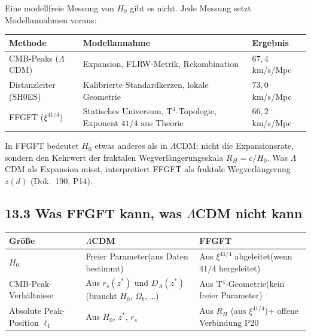 Eine modellfreie Messung von $H_0$ gibt es nicht.
Jede Messung setzt Modellannahmen voraus:

\begin{center}
\begin{tabular}{p{3.5cm}p{5.5cm}p{3cm}}
\toprule
\textbf{Methode} & \textbf{Modellannahme} & \textbf{Ergebnis} \\
\midrule
CMB-Peaks ($\Lambda$CDM) &
  Expansion, FLRW-Metrik, Rekombination &
  $67{,}4$ km/s/Mpc \\
\addlinespace
Distanzleiter (SH0ES) &
  Kalibrierte Standardkerzen, lokale Geometrie &
  $73{,}0$ km/s/Mpc \\
\addlinespace
FFGFT ($\xi^{41/4}$) &
  Statisches Universum, T$^4$-Topologie,\newline
  Exponent $41/4$ aus Theorie &
  $66{,}2$ km/s/Mpc \\
\bottomrule
\end{tabular}
\end{center}

In FFGFT bedeutet $H_0$ etwas anderes als in $\Lambda$CDM:
nicht die Expansionsrate, sondern den Kehrwert der
fraktalen Wegverlängerungsskala $R_H = c/H_0$.
Was $\Lambda$CDM als Expansion misst, interpretiert FFGFT
als fraktale Wegverlängerung $z(d)$ (Dok.~190, P14).

\subsection*{13.3 Was FFGFT kann, was $\Lambda$CDM nicht kann}

\begin{center}
\begin{tabular}{p{5cm}p{4.5cm}p{4.5cm}}
\toprule
\textbf{Größe} & \textbf{$\Lambda$CDM} & \textbf{FFGFT} \\
\midrule
$H_0$ &
  Freier Parameter\newline (aus Daten bestimmt) &
  Aus $\xi^{41/4}$ abgeleitet\newline (wenn $41/4$ hergeleitet) \\
\addlinespace
CMB-Peak-Verhältnisse &
  Aus $r_s(z^*)$ und $D_A(z^*)$\newline (braucht $H_0$, $\Omega_b$, \ldots) &
  Aus T$^4$-Geometrie\newline (kein freier Parameter) \\
\addlinespace
Absolute Peak-Position $\ell_1$ &
  Aus $H_0$, $z^*$, $r_s$ &
  Aus $R_H$ (aus $\xi^{41/4}$)\newline + offene Verbindung P20 \\
\bottomrule
\end{tabular}
\end{center}

